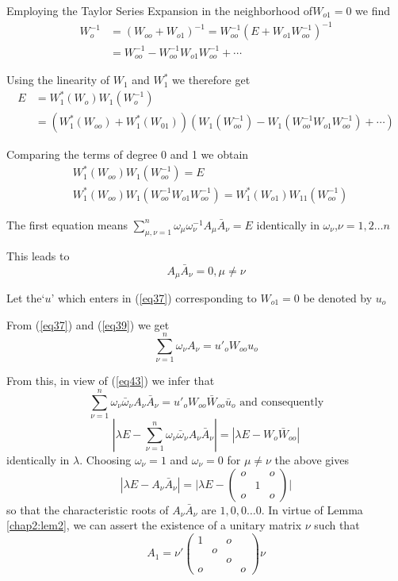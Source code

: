  Employing the Taylor Series Expansion in the neighborhood of\break $W_{o1} =
 0$ we find 
 \begin{align*}
W^{-1}_o & = (W_{oo} + W_{o1})^{-1} = W_{oo}^{-1} (E + W_{o1}
W_{oo}^{-1})^{-1}\\ 
& = W_{oo}^{-1} - W_{oo}^{-1} W_{o1} W_{oo}^{-1} + \cdots
 \end{align*} 

 Using the linearity of $W_1$ and $W^*_1$ we therefore get
 \begin{align*}
E &= W^*_1 (W_o) W_1 (W_o^{-1})\\
& = (W^*_1 (W_{oo}) + W^*_1 (W_{01})) (W_1 (W_{oo}^{-1}) - W_1
(W^{-1}_{oo} W_{o1} W_{oo}^{-1}) + \cdots) 
 \end{align*} 
 
 Comparing the terms of degree 0 and 1 we obtain
 \begin{align*}
& W^*_1 (W_{oo}) W_1 (W_{oo}^{-1}) = E \tag{41}\label{eq41} \\
 & W^*_1 (W_{oo}) W_1 (W_{oo}^{-1} W_{o1} W^{-1}_{oo}) = W^*_1
   (W_{o1}) W_{11} (W^{-1}_{oo}) \tag{42}\label{eq42}  
 \end{align*}
 
 The first equation means
$ \sum ^n _{\mu,\nu = 1} \omega _\mu \omega ^{-1}_\nu A_\mu
 \bar{A}_\nu = E$ identically in $\omega_\nu$,\break $\nu = 1,2\dots n$ 
 
 This leads to 
 \begin{equation*}
A_\mu \bar{A}_\nu = 0, \mu \neq \nu \tag{43}\label{eq43} 
 \end{equation*} 

 Let the\pageoriginale `$u$' which enters in (\ref{eq37})
 corresponding to $W_{o1} = 0$ be  denoted by $u_o$  
 
 From (\ref{eq37}) and (\ref{eq39}) we get 
 $$
 \sum_{\nu =1}^n \omega_\nu A_\nu = u'_o W_{oo} u_o 
 $$
 
 From this, in view of (\ref{eq43}) we infer that 
 $$
 \sum_{\nu=1}^n \omega_\nu \bar{\omega}_\nu A_\nu \bar{A}_\nu = u'_o
 W_{oo} \bar{W}_{oo} \bar{u}_o \text{ and  consequently} 
 $$ 
 $$
 |\lambda E -\sum^n_{\nu=1} \omega_\nu \bar{\omega}_\nu A_\nu
 \bar{A}_\nu | = | \lambda E -W_o \bar{W}_{oo}| 
 $$
 identically in $\lambda$. Choosing $\omega_\nu = 1$ and $\omega_\nu = 0$
 for $\mu \neq \nu$ the above gives  
 $$ 
 |\lambda E - A_\nu \bar{A}_\nu| = \bigg|\lambda E- \begin{pmatrix}  o
  & & o \\  & 1 & \\ o & & o\end{pmatrix}\bigg| 
 $$
 so that the characteristic roots of $A_\nu \bar{A}_\nu$ are $1,0,0
 \dots 0 $. In virtue of Lemma \ref{chap2:lem2}, we can assert the
 existence of a unitary matrix $\nu$ such that 
 $$
 A_1 = \nu' \begin{pmatrix} 1 &  & o \\ &  o& & \\ & & o & \\o & && 
   o \end{pmatrix} \nu 
 $$
 
